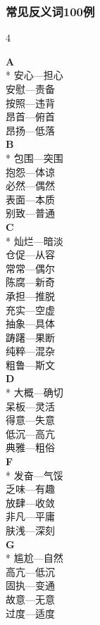 \documentclass[final,oneside]{ctexbook}
\begin{document}
\subsubsection{常见反义词100例}

\begin{multicols}{4}
  \centering

  \textbf{A}\\*
  安心---担心\\
  安慰---责备\\
  按照---违背\\
  昂首---俯首\\
  昂扬---低落\\

  \textbf{B}\\*
  包围---突围\\
  抱怨---体谅\\
  必然---偶然\\
  表面---本质\\
  别致---普通\\

  \textbf{C}\\*
  灿烂---暗淡\\
  仓促---从容\\
  常常---偶尔\\
  陈腐---新奇\\
  承担---推脱\\
  充实---空虚\\
  抽象---具体\\
  踌躇---果断\\
  纯粹---混杂\\
  粗鲁---斯文\\

  \textbf{D}\\*
  大概---确切\\
  呆板---灵活\\
  得意---失意\\
  低沉---高亢\\
  典雅---粗俗\\

  \textbf{F}\\*
  发奋---气馁\\
  乏味---有趣\\
  放肆---收敛\\
  非凡---平庸\\
  肤浅---深刻\\

  \textbf{G}\\*
  尴尬---自然\\
  高亢---低沉\\
  固执---变通\\
  故意---无意\\
  过度---适度\\


\end{multicols}
\end{document}
